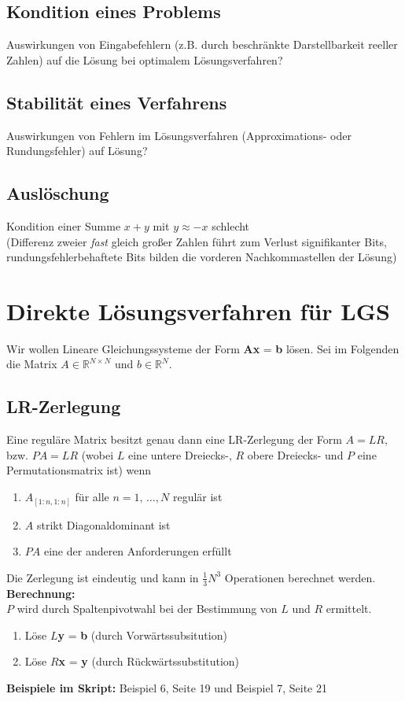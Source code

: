 \documentclass[a4paper, 14pt]{article}
\begin{document}
    \subsection{Kondition eines Problems}
    Auswirkungen von Eingabefehlern (z.B. durch beschr\"ankte Darstellbarkeit reeller Zahlen) auf die L\"osung bei
    optimalem L\"osungsverfahren?

    \subsection{Stabilit\"at eines Verfahrens}
    Auswirkungen von Fehlern im L\"osungsverfahren (Approximations- oder Rundungsfehler) auf L\"osung?

    \subsection{Ausl\"oschung}
    Kondition einer Summe $x + y$ mit $y \approx -x$ schlecht\\
    (Differenz zweier \textit{fast} gleich gro{\ss}er Zahlen f\"uhrt zum Verlust signifikanter Bits,
    rundungsfehlerbehaftete Bits bilden die vorderen Nachkommastellen der L\"osung)

    \section{Direkte L\"osungsverfahren f\"ur LGS}
    Wir wollen Lineare Gleichungssysteme der Form \textbf{Ax} = \textbf{b} l\"osen. Sei im Folgenden die Matrix
    $A\in\mathds{R}^{N\times N}$ und $b\in\mathds{R}^{N}$.

    \subsection{LR-Zerlegung}
    Eine regul\"are Matrix besitzt genau dann eine LR-Zerlegung der Form $A = LR$, bzw. $PA = LR$ (wobei $L$ eine untere
    Dreiecks-, $R$ obere Dreiecks- und $P$ eine Permutationsmatrix ist) wenn
    \begin{enumerate}
        \item $A_{[1:n,1:n]}$ f\"ur alle $n = 1,\,\hdots, N$ regul\"ar ist
        \item $A$ strikt Diagonaldominant ist
        \item $PA$ eine der anderen Anforderungen erf\"ullt
    \end{enumerate}
    Die Zerlegung ist eindeutig und kann in $\frac{1}{3}N^3$ Operationen berechnet werden.\\
    \newline
    \textbf{Berechnung:}\\
    $P$ wird durch Spaltenpivotwahl bei der Bestimmung von $L$ und $R$ ermittelt.
    \begin{enumerate}
        \item L\"ose $L$\textbf{y} = \textbf{b} (durch Vorw\"artssubsitution)
        \item L\"ose $R$\textbf{x} = \textbf{y} (durch R\"uckw\"artssubstitution)
    \end{enumerate}
    \textbf{Beispiele im Skript:} Beispiel 6, Seite 19 und Beispiel 7, Seite 21
\end{document}
